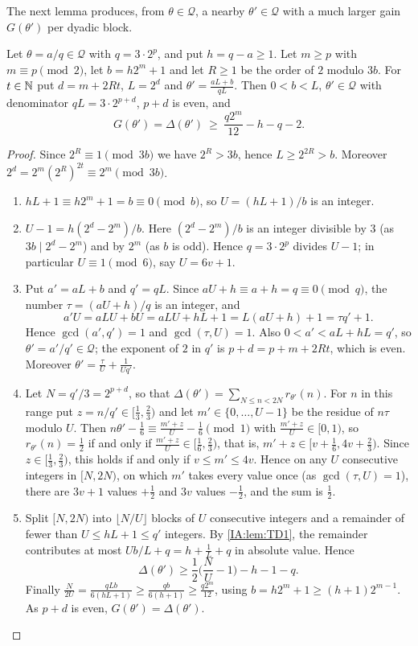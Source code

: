 The next lemma produces, from $\theta\in\mathcal Q$, a nearby $\theta'\in\mathcal Q$ with a much
larger gain $G(\theta')$ per dyadic block.

\begin{lemma}\label{IA:lem:TD3}
Let $\theta=a/q\in\mathcal Q$ with $q=3\cdot2^p$, and put $h=q-a\ge1$. Let $m\ge p$ with $m\equiv
p\pmod 2$, let $b=h2^m+1$ and let $R\ge1$ be the order of $2$ modulo $3b$. For $t\in\mathbb{N}$ put
$d=m+2Rt$, $L=2^d$ and $\theta'=\frac{aL+b}{qL}$. Then $0<b<L$, $\theta'\in\mathcal Q$ with
denominator $qL=3\cdot2^{p+d}$, $p+d$ is even, and
\[
G(\theta')=\Delta(\theta')\ \ge\ \frac{q2^m}{12}-h-q-2 .
\]
\end{lemma}

\begin{proof}
Since $2^R\equiv1\pmod{3b}$ we have $2^R>3b$, hence $L\ge2^{2R}>b$. Moreover
$2^d=2^m(2^R)^{2t}\equiv2^m\pmod{3b}$.
\begin{enumerate}[label=(\arabic*),leftmargin=*]
\item $hL+1\equiv h2^m+1=b\equiv0\pmod b$, so $U=(hL+1)/b$ is an integer.
\item $U-1=h(2^d-2^m)/b$. Here $(2^d-2^m)/b$ is an integer divisible by $3$ (as $3b\mid2^d-2^m$)
and by $2^m$ (as $b$ is odd). Hence $q=3\cdot2^p$ divides $U-1$; in particular $U\equiv1\pmod 6$, say
$U=6v+1$.
\item Put $a'=aL+b$ and $q'=qL$. Since $aU+h\equiv a+h=q\equiv0\pmod q$, the number
$\tau=(aU+h)/q$ is an integer, and
\[
a'U=aLU+bU=aLU+hL+1=L(aU+h)+1=\tau q'+1 .
\]
Hence $\gcd(a',q')=1$ and $\gcd(\tau,U)=1$. Also $0<a'<aL+hL=q'$, so $\theta'=a'/q'\in\mathcal Q$;
the exponent of $2$ in $q'$ is $p+d=p+m+2Rt$, which is even. Moreover
$\theta'=\frac{\tau}{U}+\frac{1}{Uq'}$.
\item Let $N=q'/3=2^{p+d}$, so that $\Delta(\theta')=\sum_{N\le n<2N}r_{\theta'}(n)$. For $n$ in this
range put $z=n/q'\in[\frac13,\frac23)$ and let $m'\in\{0,\dots,U-1\}$ be the residue of $n\tau$
modulo $U$. Then $n\theta'-\frac16\equiv\frac{m'+z}{U}-\frac16\pmod 1$ with $\frac{m'+z}U\in[0,1)$,
so $r_{\theta'}(n)=\frac12$ if and only if $\frac{m'+z}{U}\in[\frac16,\frac23)$, that is,
$m'+z\in[v+\frac16,4v+\frac23)$. Since $z\in[\frac13,\frac23)$, this holds if and only if
$v\le m'\le 4v$. Hence on any $U$ consecutive integers in $[N,2N)$, on which $m'$ takes every value
once (as $\gcd(\tau,U)=1$), there are $3v+1$ values $+\frac12$ and $3v$ values $-\frac12$, and the
sum is $\frac12$.
\item Split $[N,2N)$ into $\lfloor N/U\rfloor$ blocks of $U$ consecutive integers and a remainder of
fewer than $U\le hL+1\le q'$ integers. By \cref{IA:lem:TD1}, the remainder contributes at most
$Ub/L+q=h+\frac1L+q$ in absolute value. Hence
\[
\Delta(\theta')\ge\frac12\Big(\frac NU-1\Big)-h-1-q .
\]
Finally $\frac N{2U}=\frac{qLb}{6(hL+1)}\ge\frac{qb}{6(h+1)}\ge\frac{q2^m}{12}$, using
$b=h2^m+1\ge(h+1)2^{m-1}$. As $p+d$ is even, $G(\theta')=\Delta(\theta')$.\qedhere
\end{enumerate}
\end{proof}

